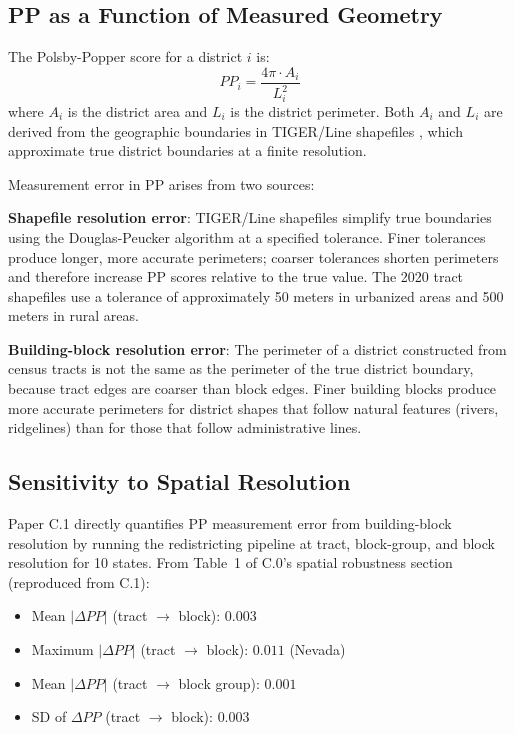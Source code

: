 
\subsection{PP as a Function of Measured Geometry}

The Polsby-Popper score for a district $i$ is:
\begin{equation}
  PP_i = \frac{4\pi \cdot A_i}{L_i^2}
  \label{eq:pp}
\end{equation}
where $A_i$ is the district area and $L_i$ is the district perimeter.
Both $A_i$ and $L_i$ are derived from the geographic boundaries in
TIGER/Line shapefiles \citep{tiger-census}, which approximate true
district boundaries at a finite resolution.

Measurement error in PP arises from two sources:

\textbf{Shapefile resolution error}: TIGER/Line shapefiles simplify
true boundaries using the Douglas-Peucker algorithm at a specified
tolerance. Finer tolerances produce longer, more accurate perimeters;
coarser tolerances shorten perimeters and therefore increase PP scores
relative to the true value. The 2020 tract shapefiles use a tolerance
of approximately 50 meters in urbanized areas and 500 meters in rural
areas.

\textbf{Building-block resolution error}: The perimeter of a district
constructed from census tracts is not the same as the perimeter of
the true district boundary, because tract edges are coarser than
block edges. Finer building blocks produce more accurate perimeters
for district shapes that follow natural features (rivers, ridgelines)
than for those that follow administrative lines.

\subsection{Sensitivity to Spatial Resolution}

Paper C.1 \citep{dellalibera2026c1} directly quantifies PP measurement
error from building-block resolution by running the redistricting
pipeline at tract, block-group, and block resolution for 10 states.
From Table~1 of C.0's spatial robustness section (reproduced from C.1):

\begin{itemize}
  \item Mean $|\Delta PP|$ (tract $\to$ block): $0.003$
  \item Maximum $|\Delta PP|$ (tract $\to$ block): $0.011$ (Nevada)
  \item Mean $|\Delta PP|$ (tract $\to$ block group): $0.001$
  \item SD of $\Delta PP$ (tract $\to$ block): $0.003$
\end{itemize}

